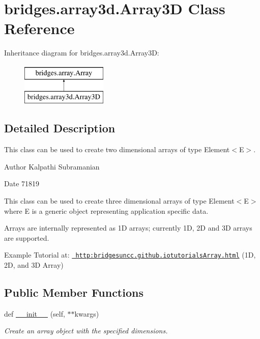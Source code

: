 \hypertarget{classbridges_1_1array3d_1_1_array3_d}{}\section{bridges.\+array3d.\+Array3D Class Reference}
\label{classbridges_1_1array3d_1_1_array3_d}
Inheritance diagram for bridges.\+array3d.\+Array3D\+:\begin{figure}[H]
\begin{center}
\leavevmode
\includegraphics[height=2.000000cm]{classbridges_1_1array3d_1_1_array3_d}
\end{center}
\end{figure}


\subsection{Detailed Description}
This class can be used to create two dimensional arrays of type Element$<$\+E$>$. 

\begin{DoxyAuthor}{Author}
Kalpathi Subramanian
\end{DoxyAuthor}
\begin{DoxyDate}{Date}
71819
\end{DoxyDate}
This class can be used to create three dimensional arrays of type Element$<$\+E$>$ where E is a generic object representing application specific data.

Arrays are internally represented as 1D arrays; currently 1D, 2D and 3D arrays are supported.

Example Tutorial at\+: \href{http:bridgesuncc.github.iotutorialsArray.html}{\texttt{ http\+:bridgesuncc.\+github.\+iotutorials\+Array.\+html}} (1D, 2D, and 3D Array)~\newline
 \subsection*{Public Member Functions}
\begin{DoxyCompactItemize}
\item 
def \mbox{\hyperlink{classbridges_1_1array3d_1_1_array3_d_a24ea126f1007b53eaf420e32f086cac3}{\+\_\+\+\_\+init\+\_\+\+\_\+}} (self, $\ast$$\ast$kwargs)
\begin{DoxyCompactList}\small\item\em Create an array object with the specified dimensions. \end{DoxyCompactList}\end{DoxyCompactItemize}

